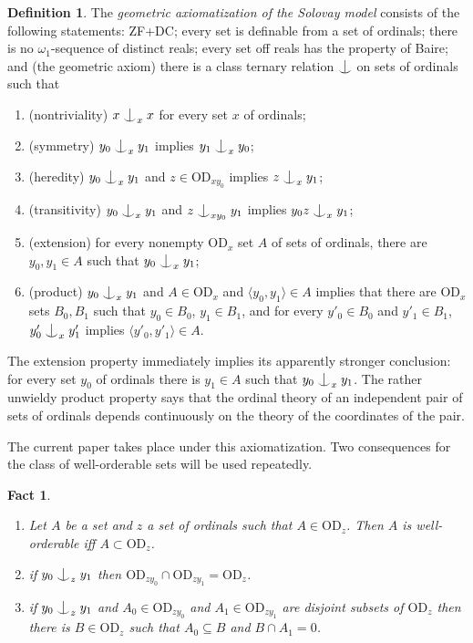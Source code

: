 \documentclass{article}
\newcommand{\gw}{\omega}
\newcommand{\forkindep}[1][]{%
  \mathrel{
    \mathop{
      \vcenter{
        \hbox{\oalign{\noalign{\kern-.3ex}\hfil$\vert$\hfil\cr
              \noalign{\kern-.7ex}
              $\smile$\cr\noalign{\kern-.3ex}}}
      }
    }\displaylimits_{#1}
  }
}
\newcommand{\vd}{\mathrm{OD}}
\newtheorem{fact}[theorem]{Fact}
\theoremstyle{definition}
\newtheorem{definition}[theorem]{Definition}
\begin{document}
	\begin{definition}
		The \emph{geometric axiomatization of the Solovay model} consists of the following statements: ZF+DC; every set is definable from a set of ordinals; there is no $\gw_1$-sequence of distinct reals; every set off reals has the property of Baire; and (the geometric axiom) there is a class ternary relation $\forkindep$ on sets of ordinals such that
		
		\begin{enumerate}
			\item (nontriviality) $x \forkindep_x x$ for every set $x$ of ordinals;
			\item (symmetry) $y_0\forkindep_xy_1$ implies $y_1\forkindep_xy_0$;
			\item (heredity) $y_0\forkindep_xy_1$ and $z\in\vd_{xy_0}$ implies $z\forkindep_x y_1$;
			\item (transitivity) $y_0\forkindep_xy_1$ and $z\forkindep_{xy_0}y_1$ implies $y_0z\forkindep_xy_1$;
			\item (extension) for every nonempty $\vd_x$ set $A$ of sets of ordinals, there are $y_0, y_1\in A$ such that $y_0\forkindep_xy_1$;
			\item (product) $y_0\forkindep_x y_1$ and $A\in\vd_x$ and $\langle y_0, y_1\rangle\in A$ implies that there are $\vd_x$ sets $B_0, B_1$ such that $y_0\in B_0$, $y_1\in B_1$, and for every $y'_0\in B_0$ and $y'_1\in B_1$, $y'_0\forkindep_xy'_1$ implies $\langle y'_0, y'_1\rangle\in A$.
		\end{enumerate}
	\end{definition}
	
	\noindent The extension property immediately implies its apparently stronger conclusion: for every set $y_0$ of ordinals there is $y_1\in A$ such that $y_0\forkindep_xy_1$. The rather unwieldy product property says that the ordinal theory of an independent pair of sets of ordinals depends continuously on the theory of the coordinates of the pair.
	
	
	
	\noindent The current paper takes place under this axiomatization. Two consequences for the class of well-orderable sets will be used repeatedly.
	
	\begin{fact}
		\label{facticfact}
		\begin{enumerate}
			\item Let $A$ be a set and $z$ a set of ordinals such that $A\in\vd_z$. Then $A$ is well-orderable iff $A\subset\vd_z$.
			\item if $y_0\forkindep_z y_1$ then $\vd_{zy_0}\cap\vd_{zy_1}=\vd_z$.
			\item if $y_0\forkindep_z y_1$ and $A_0\in \vd_{zy_0}$ and $A_1\in\vd_{zy_1}$ are disjoint subsets of $\vd_z$ then there is $B\in\vd_z$ such that $A_0\subseteq B$ and $B\cap A_1=0$.	\end{enumerate}
	\end{fact}
	
\end{document}
